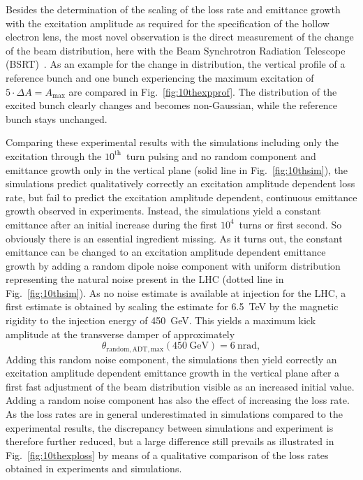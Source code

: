 \documentclass[%
 reprint,
 amsmath,amssymb,
 aps,
prstab,
]{revtex4-1}
\begin{document}
Besides the determination of the scaling of the loss rate and emittance growth with the excitation amplitude as required for the specification of the hollow electron lens, the most novel observation is the direct measurement of the change of the beam distribution, here with the Beam Synchrotron Radiation Telescope (BSRT)~\cite{bsrtprofinj}. As an example for the change in distribution, the vertical profile of a reference bunch and one bunch experiencing the maximum excitation of $5\cdot\Delta A=A_{\mathrm{max}}$ are compared in Fig.~\ref{fig:10thexpprof}. The distribution of the excited bunch clearly changes and becomes non-Gaussian, while the reference bunch stays unchanged.

Comparing these experimental results with the simulations including only the excitation through the $10^{\mathrm{th}}$~turn pulsing and no random component and emittance growth only in the vertical plane (solid line in Fig.~\ref{fig:10thsim}), the simulations predict qualitatively correctly an excitation amplitude dependent loss rate, but fail to predict the excitation amplitude dependent, continuous emittance growth observed in experiments. Instead, the simulations yield a constant emittance after an initial increase during the first $10^4$~turns or first second. So obviously there is an essential ingredient missing. As it turns out, the constant emittance can be changed to an excitation amplitude dependent emittance growth by adding a random dipole noise component with uniform distribution representing the natural noise present in the LHC (dotted line in Fig.~\ref{fig:10thsim}). As no noise estimate is available at injection for the LHC, a first estimate is obtained by scaling the estimate for 6.5~TeV \cite{md1433_noise_top_energy,md_noise_bbLHC} by the magnetic rigidity to the injection energy of 450~GeV. This yields a maximum kick amplitude at the transverse damper of approximately
\begin{equation}
\theta_{\mathrm{random,ADT,max}}(\mathrm{450~GeV}) = 6~\mathrm{nrad},
\end{equation}
Adding this random noise component, the simulations then yield correctly an excitation amplitude dependent emittance growth in the vertical plane after a first fast adjustment of the beam distribution visible as an increased initial value. Adding a random noise component has also the effect of increasing the loss rate. As the loss rates are in general underestimated in simulations compared to the experimental results, the discrepancy between simulations and experiment is therefore further reduced, but a large difference still prevails as illustrated in Fig.~\ref{fig:10thexploss} by means of a qualitative comparison of the loss rates obtained in experiments and simulations.
\end{document}
